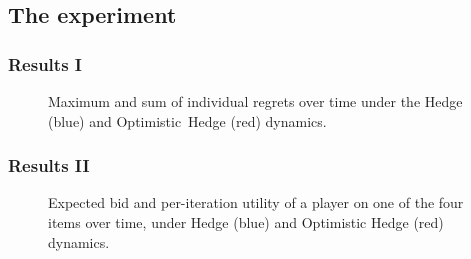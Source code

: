 \documentclass{beamer}
\begin{document}
\subsection{The experiment}
\begin{frame}
	\frametitle{Results I}
	\begin{figure}[!t]
		\centering
		\quad
		\caption{Maximum and sum of individual regrets over time under the
			Hedge (blue) and \mbox{Optimistic Hedge} (red) dynamics.}\label{fig:regrets}
	\end{figure}
\end{frame}

\begin{frame}
	\frametitle{Results II}
	\begin{figure}[!t]
		\centering
		\quad
		\caption{Expected bid and per-iteration utility of a player on one of
			the four items over time, under Hedge (blue) and {Optimistic Hedge}
			(red) dynamics.}\label{fig:bids}
	\end{figure}
\end{frame}
\end{document}
